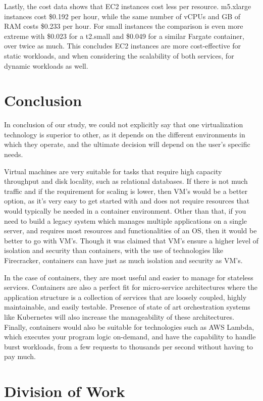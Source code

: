 \documentclass[11pt]{article}
\begin{document}
Lastly, the cost data shows that EC2 instances cost less per resource. m5.xlarge instances cost \$0.192 per hour, while the same number of vCPUs and GB of RAM costs \$0.233 per hour. For small instances the comparison is even more extreme with \$0.023 for a t2.small and \$0.049 for a similar Fargate container, over twice as much. This concludes EC2 instances are more cost-effective for static workloads, and when considering the scalability of both services, for dynamic workloads as well.

\vspace{3mm} %


\section{Conclusion}

In conclusion of our study, we could not explicitly say that one virtualization technology is superior to other, as it depends on the different environments in which they operate, and the ultimate decision will depend on the user's specific needs. 

Virtual machines are very suitable for tasks that require high capacity throughput and disk locality, such as relational databases. If there is not much traffic and if the requirement for scaling is lower, then VM's would be a better option, as it's very easy to get started with and does not require resources that would typically be needed in a container environment. Other than that, if you need to build a legacy system which manages multiple applications on a single server, and requires most resources and functionalities of an OS, then it would be better to go with VM's. Though it was claimed that VM's ensure a higher level of isolation and security than containers, with the use of technologies like Firecracker, containers can have just as much isolation and security as VM's.

In the case of containers, they are most useful and easier to manage for stateless services. Containers are also a perfect fit for micro-service architectures where the application structure is a collection of services that are loosely coupled, highly maintainable, and easily testable. Presence of state of art orchestration systems like Kubernetes will also increase the manageability of these architectures. Finally, containers would also be suitable for technologies such as AWS Lambda, which executes your program logic on-demand, and have the capability to handle burst workloads, from a few requests to thousands per second without having to pay much.

\vspace{3mm} %


\section{Division of Work}


\printbibliography
\end{document}
